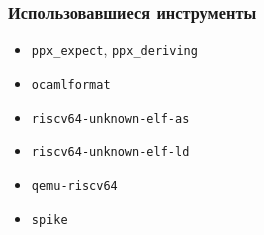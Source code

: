 \documentclass{beamer}
\begin{document}
	\begin{frame}
		\frametitle{Использовавшиеся инструменты}
			\begin{itemize}
				\item \lstinline|ppx_expect|,  \lstinline|ppx_deriving|
				\item \lstinline|ocamlformat|
				\item \lstinline|riscv64-unknown-elf-as|
				\item \lstinline|riscv64-unknown-elf-ld|
				\item \lstinline|qemu-riscv64|
				\item \lstinline|spike|
			\end{itemize}
	\end{frame}
\end{document}
